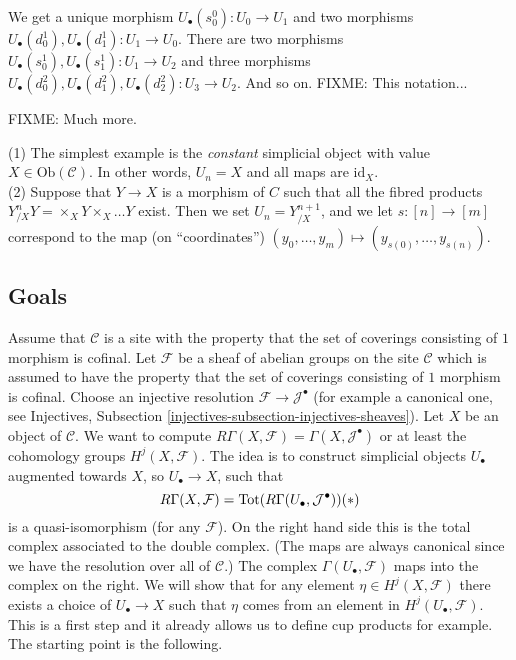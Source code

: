 \noindent
We get a unique morphism $U_\bullet(s^0_0) : U_0 \to U_1$ and
two morphisms $U_\bullet(d^1_0), U_\bullet(d^1_1) : U_1 \to U_0$.
There are two morphisms $U_\bullet(s^1_0), U_\bullet(s^1_1) :
U_1 \to U_2$ and three morphisms $U_\bullet(d^2_0), 
U_\bullet(d^2_1), U_\bullet(d^2_2) : U_3 \to U_2$. And so on.
FIXME: This notation...

\smallskip\noindent
FIXME: Much more.

\begin{example}
\label{example-simplicial-products}
(1) The simplest example is the {\it constant} simplicial object with
value $X \in \text{Ob}(\mathcal{C})$. In other words, $U_n=X$ and
all maps are $\text{id}_X$. \\
(2) Suppose that $Y\to X$ is a morphism of $C$ such that all
the fibred products $Y_{/X}^nY = \times_X Y \times_X \ldots Y$ exist.
Then we set $U_n = Y^{n+1}_{/X}$, and we let $s: [n] \to [m]$
correspond to the map (on ``coordinates'') $(y_0,\ldots, y_m) 
\mapsto (y_{s(0)},\ldots, y_{s(n)})$.
\end{example}

\subsection{Goals}

\noindent
Assume that $\mathcal{C}$ is a site with the property
that the set of coverings consisting of $1$ morphism is cofinal.
Let $\mathcal{F}$ be a sheaf of abelian groups on
the site $\mathcal{C}$ which is assumed to have the property
that the set of coverings consisting of $1$ morphism is cofinal.
Choose an injective resolution $\mathcal{F} \to \mathcal{J}^\bullet$
(for example a canonical one, see 
Injectives, Subsection \ref{injectives-subsection-injectives-sheaves}).
Let $X$ be an object of $\mathcal{C}$. We want to compute 
$R\Gamma(X, \mathcal{F}) = \Gamma(X, \mathcal{J}^\bullet)$
or at least the cohomology groups $H^j(X, \mathcal{F})$.
The idea is to construct simplicial objects $U_\bullet$ 
augmented towards $X$, so $U_\bullet \to X$, such that 
$$
R\Gamma(X, \mathcal{F}) 
= \text{Tot}(R\Gamma(U_\bullet, \mathcal{J}^\bullet))
\relax{(*)}
$$
is a quasi-isomorphism (for any $\mathcal{F}$). On the right hand 
side this is the total complex associated to the double complex. 
(The maps are always canonical since we have the resolution over 
all of $\mathcal{C}$.)
The complex $\Gamma(U_\bullet, \mathcal{F})$ maps into the
complex on the right. We will show that for any
element $\eta \in H^j(X, \mathcal{F})$ there exists a choice
of $U_\bullet \to X$ such that $\eta$ comes from an element
in $H^j(U_\bullet, \mathcal{F})$. This is a first step and
it already allows us to define cup products for example.
The starting point is the following.


